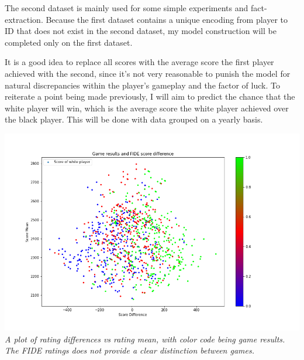 \documentclass[12pt, letterpaper]{article}
\begin{document}
\begin{multicols}{2}
The second dataset is mainly used for some simple experiments and fact-extraction. Because the first dataset contains a unique encoding from player to ID that does not exist in the second dataset, my model construction will be completed only on the first dataset.

It is a good idea to replace all scores with the average score the first player achieved with the second, since it’s not very reasonable to punish the model for natural discrepancies within the player’s gameplay and the factor of luck. To reiterate a point being made previously, I will aim to predict the chance that the white player will win, which is the average score the white player achieved over the black player. This will be done with data grouped on a yearly basis.

\setlength{\parskip}{0.0cm}
\begin{center}
\begin{small}
\includegraphics[width=\linewidth]{../figures/FIDE_results.png}
\textit{A plot of rating differences vs rating mean, with color code being game results. The FIDE ratings does not provide a clear distinction between games.}
\end{small}
\end{center}
\setlength{\parskip}{0.1cm}


\end{multicols}
\end{document}
